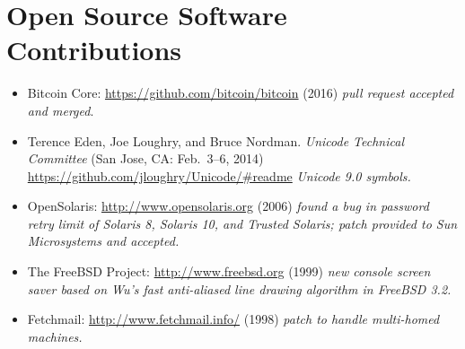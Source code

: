 \section*{Open Source Software Contributions}
\vspace{-3mm}

\begin{itemize}
    \item Bitcoin Core: \url{https://github.com/bitcoin/bitcoin} (2016)
        \emph{pull request accepted and merged}.\vspace{-2mm}
	\item Terence Eden, Joe Loughry, and Bruce Nordman. \emph{Unicode
		Technical Committee} (San Jose, CA: Feb.\ 3--6, 2014)
		\url{https://github.com/jloughry/Unicode/#readme}
    \emph{Unicode 9.0 symbols.}\vspace{-2mm}
	\item OpenSolaris: \url{http://www.opensolaris.org} (2006)
		\emph{found a bug in password retry limit of Solaris 8, Solaris 10,
		and Trusted Solaris; patch provided to Sun Microsystems and accepted.}\vspace{-2mm}
	\item The FreeBSD Project: \url{http://www.freebsd.org} (1999)
		\emph{new console screen saver based on Wu's fast
		anti-aliased line drawing algorithm in FreeBSD 3.2.}\vspace{-2mm}
	\item Fetchmail: \url{http://www.fetchmail.info/} (1998)
		\emph{patch to handle multi-homed machines.}
\end{itemize}

